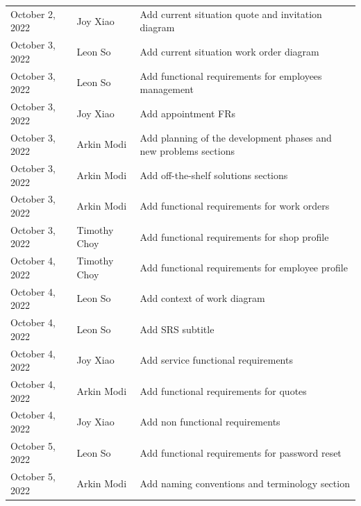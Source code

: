 \documentclass[12pt]{article}
\begin{document}
\begin{longtable}{p{} p{} p{}}
	October 2, 2022    & Joy Xiao              & Add current situation quote and invitation diagram                                 \\
	October 3, 2022    & Leon So               & Add current situation work order diagram                                           \\
	October 3, 2022    & Leon So               & Add functional requirements for employees management                               \\
	October 3, 2022    & Joy Xiao              & Add appointment FRs                                                                \\
	October 3, 2022    & Arkin Modi            & Add planning of the development phases and new problems sections                   \\
	October 3, 2022    & Arkin Modi            & Add off-the-shelf solutions sections                                               \\
	October 3, 2022    & Arkin Modi            & Add functional requirements for work orders                                        \\
	October 3, 2022    & Timothy Choy          & Add functional requirements for shop profile                                       \\
	October 4, 2022    & Timothy Choy          & Add functional requirements for employee profile                                   \\
	October 4, 2022    & Leon So               & Add context of work diagram                                                        \\
	October 4, 2022    & Leon So               & Add SRS subtitle                                                                   \\
	October 4, 2022    & Joy Xiao              & Add service functional requirements                                                \\
	October 4, 2022    & Arkin Modi            & Add functional requirements for quotes                                             \\
	October 4, 2022    & Joy Xiao              & Add non functional requirements                                                    \\
	October 5, 2022    & Leon So               & Add functional requirements for password reset                                     \\
	October 5, 2022    & Arkin Modi            & Add naming conventions and terminology section                                     \\

\end{longtable}
\end{document}
